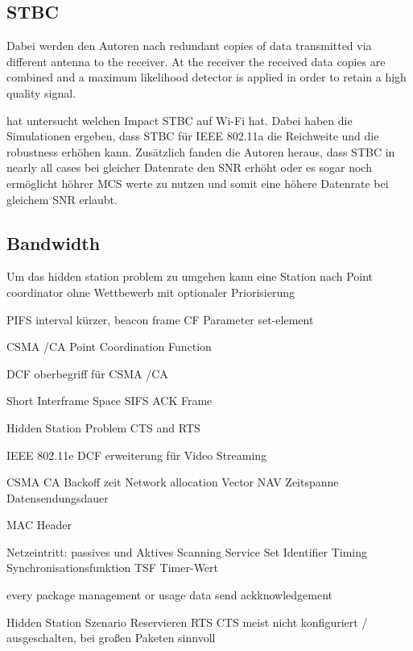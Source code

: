 \documentclass[]{nsm-thesis}
\begin{document}
\subsection{\ac{STBC}}
Dabei werden den Autoren nach redundant copies of data transmitted via different antenna to the receiver. At the receiver the received data copies are combined and a maximum likelihood detector is applied in order to retain a high quality signal\cite{Santumon}.

\textcite{Stamoulis} hat untersucht welchen Impact \ac{STBC} auf Wi-Fi hat. Dabei haben die Simulationen ergeben, dass STBC für IEEE 802.11a die Reichweite und die robustness erhöhen kann. Zusätzlich fanden die Autoren heraus, dass \ac{STBC} in nearly all cases bei gleicher Datenrate den SNR erhöht oder es sogar noch ermöglicht höhrer MCS werte zu nutzen und somit eine höhere Datenrate bei gleichem SNR erlaubt.  




\subsection{Bandwidth}
Um das hidden station problem zu umgehen kann eine Station nach \textcite{sauter_wireless_2022} 
Point coordinator 
ohne Wettbewerb mit optionaler Priorisierung

PIFS interval kürzer, 
beacon frame
CF Parameter set-element

CSMA /CA
Point Coordination Function

\textcite{sauter_wireless_2022}
DCF oberbegriff für CSMA /CA
 
 
Short Interframe Space SIFS ACK Frame 
 
Hidden Station Problem 
CTS and RTS
 
IEEE 802.11e DCF erweiterung für Video Streaming

CSMA CA Backoff zeit
Network allocation Vector NAV Zeitspanne Datensendungsdauer

MAC Header

Netzeintritt:
passives und Aktives Scanning
Service Set Identifier
Timing Synchronisationsfunktion TSF Timer-Wert

\textcite{sauter_wireless_2022}
every package management or usage data send ackknowledgement

Hidden Station Szenario
Reservieren
RTS CTS
meist nicht konfiguriert / ausgeschalten, bei großen Paketen sinnvoll
\end{document}
